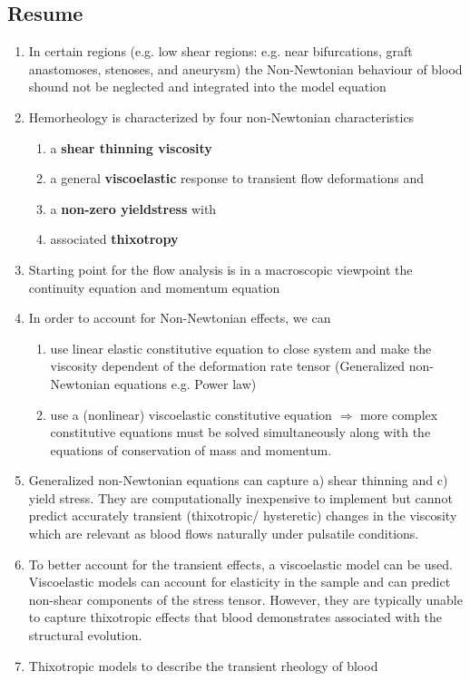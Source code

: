 \documentclass[11pt,letterpaper]{article}
\begin{document}
\subsection*{Resume}
\begin{enumerate}
    \item In certain regions (e.g. low shear regions: e.g. near bifurcations, graft anastomoses, stenoses, and  aneurysm) the Non-Newtonian behaviour of blood shound not be neglected and integrated into the model equation
    \item Hemorheology is characterized by 
four non-Newtonian characteristics 
\begin{enumerate}
 \item a \textbf{shear thinning viscosity}
 \item a general \textbf{viscoelastic} response to transient flow deformations and 
 \item a \textbf{non-zero yieldstress} with
 \item associated \textbf{thixotropy}
\end{enumerate}
    \item Starting point for the flow analysis is in a macroscopic viewpoint the continuity equation and momentum equation
    \item In order to account for Non-Newtonian effects, we can\begin{enumerate}
        \item use linear elastic constitutive equation to close system and make the viscosity dependent of the deformation rate tensor (Generalized non-Newtonian equations e.g. Power law)
        \item use a (nonlinear) viscoelastic constitutive equation $\Rightarrow$ more complex constitutive equations must be solved simultaneously along with the equations of conservation of mass and momentum.
    \end{enumerate}  
\item  Generalized non-Newtonian equations can capture a) shear thinning and c) yield stress. They are computationally inexpensive
to implement but cannot predict accurately transient (thixotropic/
hysteretic) changes in the viscosity which are relevant as blood
flows naturally under pulsatile conditions.
\item To better account for
the transient effects, a viscoelastic model can be used. 
Viscoelastic models can account for elasticity in the sample
and can predict non-shear components of the stress tensor. However, they are typically unable to capture thixotropic effects that
blood demonstrates associated with the structural evolution.
\item Thixotropic models to
describe the transient rheology of blood
\end{enumerate}
\end{document}

